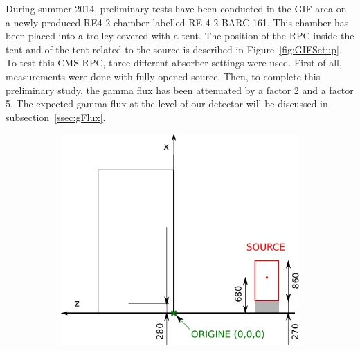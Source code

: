		During summer 2014, preliminary tests have been conducted in the GIF area on a newly produced RE4-2 chamber labelled RE-4-2-BARC-161. This chamber has been placed into a trolley covered with a tent. The position of the RPC inside the tent and of the tent related to the source is described in Figure~\ref{fig:GIFSetup}. To test this CMS RPC, three different absorber settings were used. First of all, measurements were done with fully opened source. Then, to complete this preliminary study, the gamma flux has been attenuated by a factor 2 and a factor 5. The expected gamma flux at the level of our detector will be discussed in subsection~\ref{ssec:gFlux}.

				\begin{figure}[!h]
			\begin{subfigure}{0.5\linewidth}
				\includegraphics[width = 0.5\plotwidth]{fig/position-side.pdf}
				\caption{\label{fig:GIFSetup:A}}
			\end{subfigure}
			\begin{subfigure}{0.5\linewidth}

\end{subfigure}
\end{figure}
